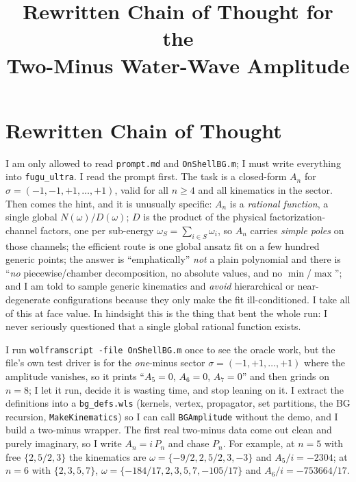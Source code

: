 \documentclass{article}
\title{Rewritten Chain of Thought for the\\
Two-Minus Water-Wave Amplitude}
\author{}
\date{}
\begin{document}
\maketitle


\section*{Rewritten Chain of Thought}

I am only allowed to read \texttt{prompt.md} and \texttt{OnShellBG.m}; I must
write everything into \texttt{fugu\_ultra}. I read the prompt first. The task is a
closed-form $A_n$ for $\sigma=(-1,-1,+1,\dots,+1)$, valid for all $n\ge4$ and all
kinematics in the sector. Then comes the hint, and it is unusually specific: $A_n$
is a \emph{rational function}, a single global $N(\omega)/D(\omega)$; $D$ is the
product of the physical factorization-channel factors, one per sub-energy
$\omega_S=\sum_{i\in S}\omega_i$, so $A_n$ carries \emph{simple poles} on those
channels; the efficient route is one global ansatz fit on a few hundred generic
points; the answer is ``emphatically'' \emph{not} a plain polynomial and there is
``\emph{no} piecewise/chamber decomposition, no absolute values, and no
$\min$/$\max$''; and I am told to sample generic kinematics and \emph{avoid}
hierarchical or near-degenerate configurations because they only make the fit
ill-conditioned. I take all of this at face value. In hindsight this is the thing
that bent the whole run: I never seriously questioned that a single global
rational function exists.

I run \texttt{wolframscript -file OnShellBG.m} once to see the oracle work, but
the file's own test driver is for the \emph{one}-minus sector
$\sigma=(-1,+1,\dots,+1)$ where the amplitude vanishes, so it prints
``$A_5=0$, $A_6=0$, $A_7=0$'' and then grinds on $n=8$; I let it run, decide it is
wasting time, and stop leaning on it. I extract the definitions into a
\texttt{bg\_defs.wls} (kernels, vertex, propagator, set partitions, the BG
recursion, \texttt{MakeKinematics}) so I can call \texttt{BGAmplitude} without the
demo, and I build a two-minus wrapper. The first real two-minus data come out
clean and purely imaginary, so I write $A_n=i\,P_n$ and chase $P_n$. For
example, at $n=5$ with free $\{2,5/2,3\}$ the kinematics are
$\omega=\{-9/2,2,5/2,3,-3\}$ and $A_5/i=-2304$; at $n=6$ with
$\{2,3,5,7\}$, $\omega=\{-184/17,2,3,5,7,-105/17\}$ and $A_6/i=-753664/17$.
\end{document}
